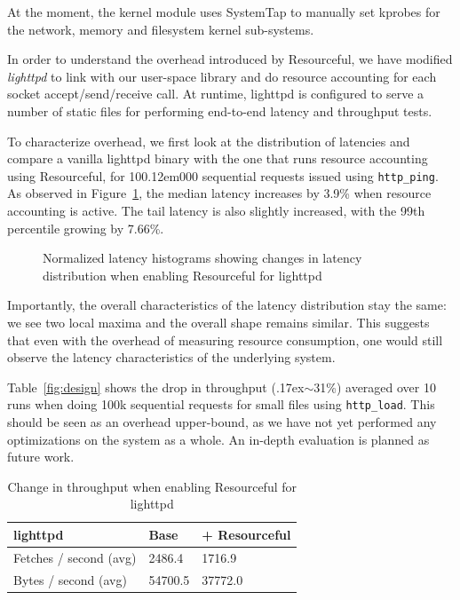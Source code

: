 \documentclass[12pt,twoside,a4paper]{article}
\newcommand{\pname}{Resourceful}
\begin{document}
At the moment, the kernel module uses SystemTap to manually set kprobes for the
network, memory and filesystem kernel sub-systems.

In order to understand the overhead introduced by \pname, we have modified
\textit{lighttpd} to link with our user-space library and do resource accounting
for each socket accept/send/receive call. At runtime, lighttpd is configured to serve
a number of static files for performing end-to-end latency and throughput tests.

To characterize overhead, we first look at the distribution of latencies and
compare a vanilla lighttpd binary with the one that runs resource accounting
using \pname, for 10{\kern 0.12em}000 sequential requests issued using \texttt{http\_ping}. As
observed in Figure~\ref{fig:experiment1}, the median latency increases by 3.9\%
when resource accounting is active. The tail latency is also slightly increased,
with the 99th percentile growing by 7.66\%.
\begin{figure}[ht!] 
	\centering
	\def\svgwidth{0.7\columnwidth}
	
	\caption{Normalized latency histograms showing changes in latency distribution when enabling \pname{ }for lighttpd} 
	\label{fig:experiment1}
\end{figure}

Importantly, the overall characteristics of the latency distribution stay the
same: we see two local maxima and the overall shape remains similar. This
suggests that even with the overhead of measuring resource consumption, one
would still observe the latency characteristics of the underlying system. 

Table~\ref{fig:design} shows the drop in throughput ({\raise.17ex\hbox{$\scriptstyle\sim$}}31\%) averaged over 10
runs when doing 100k sequential requests for small files using \texttt{http\_load}. This should
be seen as an overhead upper-bound, as we have not yet performed any
optimizations on the system as a whole. An in-depth evaluation is planned as
future work.

\begin{table}[ht!]
	\centering 
    \begin{tabular}{|l|l|l|}
    \hline
    \textbf{lighttpd}         & Base & + \pname \\ \hline
    Fetches / second (avg) & 2486.4 & 1716.9 \\ \hline
    Bytes / second (avg) & 54700.5 & 37772.0 \\ \hline
    \end{tabular}
    \caption{Change in throughput when enabling \pname{ } for lighttpd}
    \label{tbl:throughput} 
\end{table}
\end{document}
